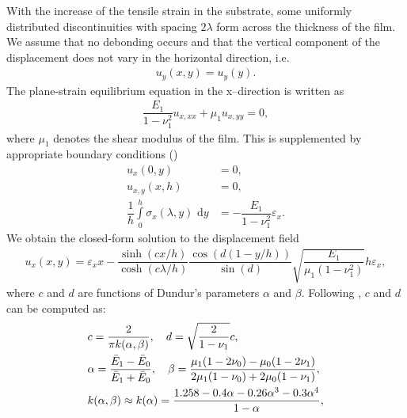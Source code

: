 



With the increase of the tensile strain in the substrate, some uniformly distributed discontinuities with spacing $2\lambda$ form across the thickness of the film. We assume that no debonding occurs and that the vertical component of the displacement does not vary in the horizontal direction, i.e.
\begin{align}
  u_y(x,y) = u_y(y) .
\end{align}
The plane-strain equilibrium equation in the x--direction is written as
\begin{align}
  \dfrac{E_1}{1-\nu_1^2}u_{x,xx} + \mu_1u_{x,yy} = 0 ,
\end{align}
where $\mu_1$ denotes the shear modulus of the film.  This is supplemented by appropriate boundary conditions ()
\begin{align}
  u_x(0,y)                                                    & = 0 ,                                    \\
  u_{x,y}(x,h)                                                & = 0 ,                                    \\
  \dfrac{1}{h}\int\limits_{0}^h \sigma_x(\lambda,y)\text{ d}y & = -\dfrac{E_1}{1-\nu_1^2}\varepsilon_x . 
\end{align}
We obtain the closed-form solution to the displacement field
\begin{align}
  u_x(x,y) = \varepsilon_xx-\dfrac{\sinh(cx/h)}{\cosh(c\lambda/h)}\dfrac{\cos(d(1-y/h))}{\sin(d)}\sqrt{\dfrac{E_1}{\mu_1(1-\nu_1^2)}}h\varepsilon_x ,
\end{align}
where $c$ and $d$ are functions of Dundur's parameters $\alpha$ and $\beta$. Following \cite{BEUTH19921657,xia2000crack,yin2008explicit}, $c$ and $d$ can be computed as:
\begin{align}
   & c = \dfrac{2}{\pi k(\alpha,\beta)}, \quad d = \sqrt{\dfrac{2}{1-\nu_1}}c ,                                                                          \\
   & \alpha = \dfrac{\Bar{E}_1-\Bar{E}_0}{\Bar{E}_1+\Bar{E}_0}, \quad \beta = \dfrac{\mu_1(1-2\nu_0)-\mu_0(1-2\nu_1)}{2\mu_1(1-\nu_0)+2\mu_0(1-\nu_1)} , \\
   & k(\alpha,\beta) \approx k(\alpha) = \dfrac{1.258-0.4\alpha-0.26\alpha^3-0.3\alpha^4}{1-\alpha} ,                                                    
\end{align}
